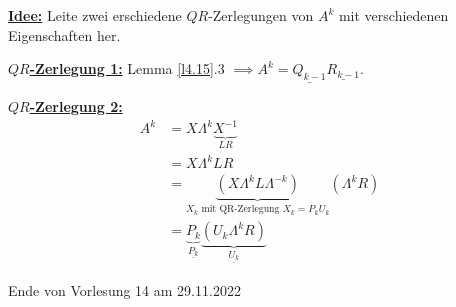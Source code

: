 \documentclass{book}
\begin{document}
            \underline{\textbf{Idee:}} Leite zwei erschiedene $QR$-Zerlegungen von $A^k$ mit verschiedenen Eigenschaften 
            her. 

            \underline{\textbf{$QR$-Zerlegung 1:}} Lemma \ref{l4.15}.3 $\implies A^k=\underline{Q_{k-1}}\underline{R_{k-1}}$.

            \underline{\textbf{$QR$-Zerlegung 2:}} 
            \begin{align*}
                A^k&=X\Lambda^k\underbrace{X^{-1}}_{LR}\\
                &=X\Lambda^k LR\\
                &=\underbrace{(X\Lambda^k L\Lambda^{-k})}_{X_k\text{ mit QR-Zerlegung } X_k=P_kU_k}(\Lambda^k R)\\
                &=\underbrace{P_k}_{\underline{P_k}}\underbrace{(U_k\Lambda^kR)}_{\underline{U_k}}
            \end{align*}

            \noindent
            \xrfill[0.7ex]{1pt}Ende von Vorlesung 14 am 29.11.2022\xrfill[0.7ex]{1pt}
\end{document}
